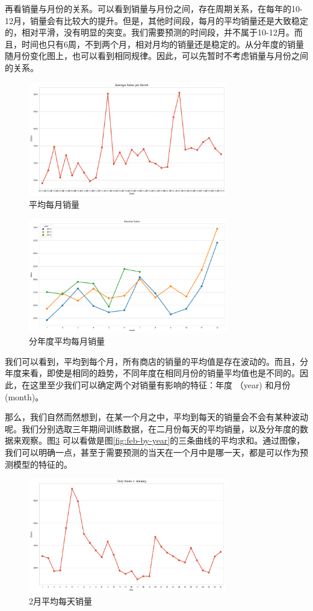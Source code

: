 \documentclass[a4paper]{article}
\begin{document}
再看销量与月份的关系。可以看到销量与月份之间，存在周期关系，在每年的10-12月，销量会有比较大的提升。但是，其他时间段，每月的平均销量还是大致稳定的，相对平滑，没有明显的突变。我们需要预测的时间段，并不属于10-12月。而且，时间也只有6周，不到两个月，相对月均的销量还是稳定的。从分年度的销量随月份变化图上，也可以看到相同规律。因此，可以先暂时不考虑销量与月份之间的关系。
\begin{figure}[ht]
 \centering
 \includegraphics[height=5cm]{images/sales-month.png}
 \caption{平均每月销量}
 \label{fig:month}
\end{figure}

\begin{figure}[ht]
 \centering
 \includegraphics[height=5cm]{images/month-sale-by-year.png}
 \caption{分年度平均每月销量}
 \label{fig:month-by-year}
\end{figure}

我们可以看到，平均到每个月，所有商店的销量的平均值是存在波动的。而且，分年度来看，即使是相同的趋势，不同年度在相同月份的销量平均值也是不同的。因此，在这里至少我们可以确定两个对销量有影响的特征：年度 （year) 和月份 (month)。

那么，我们自然而然想到，在某一个月之中，平均到每天的销量会不会有某种波动呢。我们分别选取三年期间训练数据，在二月份每天的平均销量，以及分年度的数据来观察。图\ref{fig:feb} 可以看做是图\ref{fig:feb-by-year}的三条曲线的平均求和。通过图像，我们可以明确一点，甚至于需要预测的当天在一个月中是哪一天，都是可以作为预测模型的特征的。

\begin{figure}[ht]
 \centering
 \includegraphics[height=5cm]{images/daily-in-month.png}
 \caption{2月平均每天销量}
 \label{fig:feb}
\end{figure}
\end{document}
